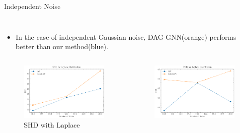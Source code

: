 \documentclass{beamer}
\begin{document}
\begin{frame}[allowframebreaks]{Independent Noise}
\begin{columns}
\begin{column}{0.5\textwidth}
\begin{figure}
            \end{figure}
        \end{column}
    \end{columns}
    \begin{itemize}
        \item In the case of independent Gaussian noise, DAG-GNN(orange) performs better than our method(blue).
    \end{itemize}
    \begin{columns}
        \begin{column}{0.5\textwidth}
            \begin{figure}
                \centering
                \includegraphics[width=\textwidth]{fig/SHD_independence_laplace.pdf}
                \caption{SHD with Laplace}
                \label{fig:ind_laplace_shd}
            \end{figure}
        \end{column}
        \begin{column}{0.5\textwidth}
            \begin{figure}
                \centering
                \includegraphics[width=\textwidth]{fig/FDR_independence_laplace.pdf}

\end{figure}
\end{column}
\end{columns}
\end{frame}
\end{document}
